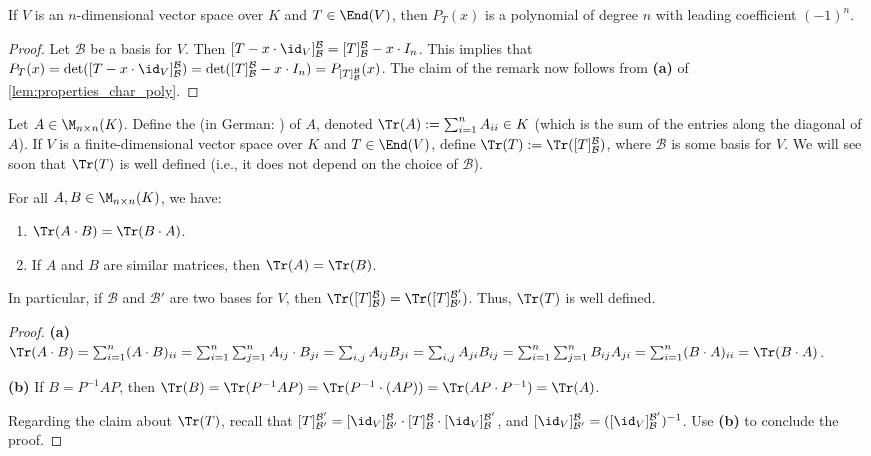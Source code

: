 \begin{remark}\label{rem:char_poly_degree}
  If $V$ is an $n$-di\-men\-sional vector space over $K$ and $T \in \End(V)$, then $P_T(x)$ is a polynomial of degree $n$ with leading coefficient $(-1)^n$.
\end{remark}
\begin{proof}
  Let $\mathcal{B}$ be a basis for $V$. Then $[T - x \cdot \id_V]_{\mathcal{B}}^{\mathcal{B}} = [T]_{\mathcal{B}}^{\mathcal{B}} - x \cdot I_n$. This implies that $P_T(x) = \det([T - x \cdot \id_V]_{\mathcal{B}}^{\mathcal{B}}) = \det([T]_{\mathcal{B}}^{\mathcal{B}} - x \cdot I_n) = P_{[T]_{\mathcal{B}}^{\mathcal{B}}}(x)$. The claim of the remark now follows from \textbf{(a)} of \cref{lem:properties_char_poly}.
\end{proof}

\begin{definition}[Trace]\label{def:trace}
  Let $A \in \M_{n \times n}(K)$. Define the  (in German: ) of $A$, denoted $\Tr(A) := \sum_{i=1}^n A_{ii} \in K$ (which is the sum of the entries along the diagonal of $A$).
  If $V$ is a finite-di\-men\-sional vector space over $K$ and $T \in \End(V)$, define $\Tr(T) := \Tr([T]_{\mathcal{B}}^{\mathcal{B}})$, where $\mathcal{B}$ is some basis for $V$. We will see soon that $\Tr(T)$ is well defined (i.e., it does not depend on the choice of $\mathcal{B}$).
\end{definition}

\begin{lemma}\label{lem:properties_trace}
  For all $A, B \in \M_{n \times n}(K)$, we have:
  \begin{enumerate}[label=\textbf{(\alph*)}]
    \item $\Tr(A \cdot B) = \Tr(B \cdot A)$.
    \item If $A$ and $B$ are similar matrices, then $\Tr(A) = \Tr(B)$.
  \end{enumerate}
  In particular, if $\mathcal{B}$ and $\mathcal{B}'$ are two bases for $V$, then $\Tr([T]_{\mathcal{B}}^{\mathcal{B}}) = \Tr([T]_{\mathcal{B}'}^{\mathcal{B}'})$. Thus, $\Tr(T)$ is well defined.
\end{lemma}

\begin{proof}
  \textbf{(a)} $\Tr(A \cdot B) = \sum_{i=1}^n (A \cdot B)_{ii} = \sum_{i=1}^n \sum_{j=1}^n A_{ij} \cdot B_{ji} = \sum_{i,j} A_{ij}B_{ji} = \sum_{i,j} A_{ji}B_{ij} = \sum_{i=1}^n \sum_{j=1}^n B_{ij}A_{ji} = \sum_{i=1}^n (B \cdot A)_{ii} = \Tr(B \cdot A)$.

  \textbf{(b)} If $B = P^{-1}AP$, then $\Tr(B) = \Tr(P^{-1}AP) = \Tr(P^{-1} \cdot (AP)) = \Tr(AP \cdot P^{-1}) = \Tr(A)$.

  Regarding the claim about $\Tr(T)$, recall that $[T]_{\mathcal{B}'}^{\mathcal{B}'} = [\id_V]_{\mathcal{B}'}^{\mathcal{B}} \cdot [T]_{\mathcal{B}}^{\mathcal{B}} \cdot [\id_V]_{\mathcal{B}}^{\mathcal{B}'}$, and $[\id_V]_{\mathcal{B}'}^{\mathcal{B}} = ([\id_V]_{\mathcal{B}}^{\mathcal{B}'})^{-1}$. Use \textbf{(b)} to conclude the proof.
\end{proof}

